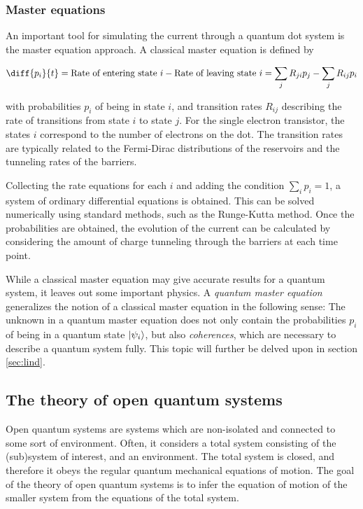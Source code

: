 \documentclass[../main.tex]{subfiles}
\begin{document}
\subsubsection{Master equations}
An important tool for simulating the current through a quantum dot system is the master equation approach. A classical master equation is defined by

\begin{equation}\label{master}
    \diff{p_i}{t} = \text{Rate of entering state } i - \text{Rate of leaving state } i = \sum_j R_{ji}p_j  - \sum_j R_{ij}p_i
\end{equation}

with probabilities $p_i$ of being in state $i$, and transition rates $R_{ij}$ describing the rate of transitions from state $i$ to state $j$. For the single electron transistor, the states $i$ correspond to the number of electrons on the dot. The transition rates are typically related to the Fermi-Dirac distributions of the reservoirs and the tunneling rates of the barriers.

Collecting the rate equations for each $i$ and adding the condition $\sum_i p_i = 1$, a system of ordinary differential equations is obtained. This can be solved numerically using standard methods, such as the Runge-Kutta method. Once the probabilities are obtained, the evolution of the current can be calculated by considering the amount of charge tunneling through the barriers at each time point.

While a classical master equation may give accurate results for a quantum system, it leaves out some important physics. A \textit{quantum master equation} generalizes the notion of a classical master equation in the following sense: The unknown in a quantum master equation does not only contain the probabilities $p_i$ of being in a quantum state $\ket{\psi_i}$, but also \textit{coherences}, which are necessary to describe a quantum system fully. This topic will further be delved upon in section \ref{sec:lind}.
\subsection{The theory of open quantum systems}
Open quantum systems are systems which are non-isolated and connected to some sort of environment. Often, it considers a total system consisting of the (sub)system of interest, and an environment. The total system is closed, and therefore it obeys the regular quantum mechanical equations of motion. The goal of the theory of open quantum systems is to infer the equation of motion of the smaller system from the equations of the total system. 
\end{document}
